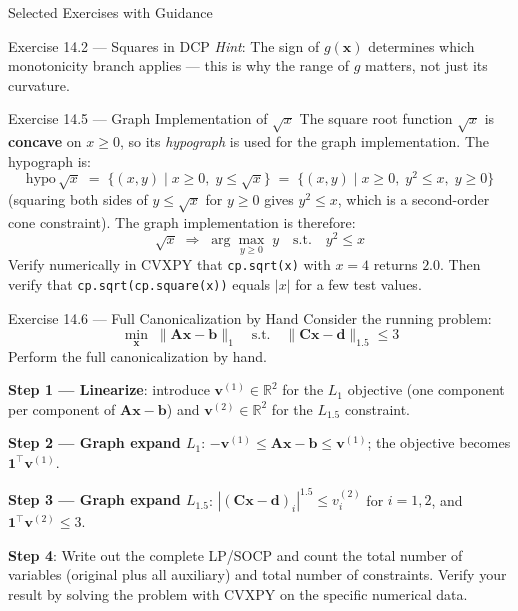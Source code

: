 \documentclass[aspectratio=169,10pt]{beamer}
\begin{document}
\begin{frame}[allowframebreaks]{Selected Exercises with Guidance}
\begin{block}{Exercise 14.2 --- Squares in DCP}
    \textit{Hint}: The sign of $g(\mathbf{x})$ determines which
    monotonicity branch applies --- this is why the range of $g$
    matters, not just its curvature.
  \end{block}

  \begin{block}{Exercise 14.5 --- Graph Implementation of $\sqrt{x}$}
    The square root function $\sqrt{x}$ is \textbf{concave} on
    $x \geq 0$, so its \emph{hypograph} is used for the graph
    implementation.  The hypograph is:
    \[
      \mathrm{hypo}\,\sqrt{x} \;=\;
      \bigl\{(x,y) \mid x \geq 0,\; y \leq \sqrt{x}\bigr\}
      \;=\; \bigl\{(x,y) \mid x \geq 0,\; y^2 \leq x,\; y \geq 0\bigr\}
    \]
    (squaring both sides of $y \leq \sqrt{x}$ for $y \geq 0$ gives
    $y^2 \leq x$, which is a second-order cone constraint).  The graph
    implementation is therefore:
    \[
      \sqrt{x} \;\Rightarrow\; \arg\max_{y \geq 0}\; y
      \quad\text{s.t.}\quad y^2 \leq x
    \]
    Verify numerically in CVXPY that \texttt{cp.sqrt(x)} with $x = 4$
    returns $2.0$.  Then verify that \texttt{cp.sqrt(cp.square(x))}
    equals $|x|$ for a few test values.
  \end{block}

  \begin{block}{Exercise 14.6 --- Full Canonicalization by Hand}
    Consider the running problem:
    \[
      \min_{\mathbf{x}}\;\|\mathbf{A}\mathbf{x} - \mathbf{b}\|_1
      \quad\text{s.t.}\quad
      \|\mathbf{C}\mathbf{x} - \mathbf{d}\|_{1.5} \leq 3
    \]
    Perform the full canonicalization by hand.

    \textbf{Step 1 --- Linearize}: introduce $\mathbf{v}^{(1)} \in
    \mathbb{R}^2$ for the $L_1$ objective (one component per component
    of $\mathbf{A}\mathbf{x} - \mathbf{b}$) and $\mathbf{v}^{(2)} \in
    \mathbb{R}^2$ for the $L_{1.5}$ constraint.

    \textbf{Step 2 --- Graph expand $L_1$}:
    $-\mathbf{v}^{(1)} \leq \mathbf{A}\mathbf{x} - \mathbf{b} \leq
    \mathbf{v}^{(1)}$; the objective becomes
    $\mathbf{1}^{\top}\mathbf{v}^{(1)}$.

    \textbf{Step 3 --- Graph expand $L_{1.5}$}:
    $|(\mathbf{C}\mathbf{x} - \mathbf{d})_i|^{1.5} \leq v_i^{(2)}$
    for $i=1,2$, and $\mathbf{1}^{\top}\mathbf{v}^{(2)} \leq 3$.

    \textbf{Step 4}: Write out the complete LP/SOCP and count the
    total number of variables (original plus all auxiliary) and total
    number of constraints.  Verify your result by solving the problem
    with CVXPY on the specific numerical data.
  \end{block}

\end{frame}
\end{document}
